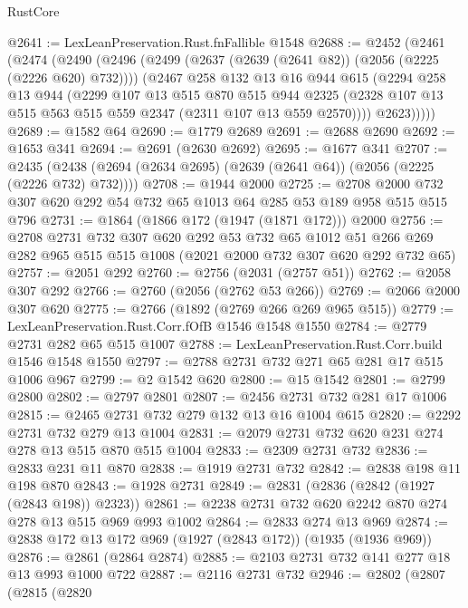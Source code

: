 \begin{lexlean}{RustCore}
\begin{coremodule}
@2641 := LexLeanPreservation.Rust.fnFallible @1548
@2688 := @2452
    (@2461
      (@2474
        (@2490
          (@2496
            (@2499 (@2637 (@2639 (@2641 @82)) (@2056 (@2225 (@2226 @620) @732))))
            (@2467
              @258
              @132
              @13
              @16
              @944
              @615
              (@2294
                @258
                @13
                @944
                (@2299
                  @107
                  @13
                  @515
                  @870
                  @515
                  @944
                  @2325
                  (@2328 @107 @13 @515 @563 @515 @559 @2347 (@2311 @107 @13 @559 @2570))))
              @2623)))))
@2689 := @1582 @64
@2690 := @1779 @2689
@2691 := @2688 @2690
@2692 := @1653 @341
@2694 := @2691 (@2630 @2692)
@2695 := @1677 @341
@2707 := @2435 (@2438 (@2694 (@2634 @2695) (@2639 (@2641 @64)) (@2056 (@2225 (@2226 @732) @732))))
@2708 := @1944 @2000
@2725 := @2708 @2000 @732 @307 @620 @292 @54 @732 @65 @1013 @64 @285 @53 @189 @958 @515 @515 @796
@2731 := @1864 (@1866 @172 (@1947 (@1871 @172))) @2000
@2756 := @2708
    @2731
    @732
    @307
    @620
    @292
    @53
    @732
    @65
    @1012
    @51
    @266
    @269
    @282
    @965
    @515
    @515
    @1008
    (@2021 @2000 @732 @307 @620 @292 @732 @65)
@2757 := @2051 @292
@2760 := @2756 (@2031 (@2757 @51))
@2762 := @2058 @307 @292
@2766 := @2760 (@2056 (@2762 @53 @266))
@2769 := @2066 @2000 @307 @620
@2775 := @2766 (@1892 (@2769 @266 @269 @965 @515))
@2779 := LexLeanPreservation.Rust.Corr.fOfB @1546 @1548 @1550
@2784 := @2779 @2731 @282 @65 @515 @1007
@2788 := LexLeanPreservation.Rust.Corr.build @1546 @1548 @1550
@2797 := @2788 @2731 @732 @271 @65 @281 @17 @515 @1006 @967
@2799 := @2 @1542 @620
@2800 := @15 @1542
@2801 := @2799 @2800
@2802 := @2797 @2801
@2807 := @2456 @2731 @732 @281 @17 @1006
@2815 := @2465 @2731 @732 @279 @132 @13 @16 @1004 @615
@2820 := @2292 @2731 @732 @279 @13 @1004
@2831 := @2079 @2731 @732 @620 @231 @274 @278 @13 @515 @870 @515 @1004
@2833 := @2309 @2731 @732
@2836 := @2833 @231 @11 @870
@2838 := @1919 @2731 @732
@2842 := @2838 @198 @11 @198 @870
@2843 := @1928 @2731
@2849 := @2831 (@2836 (@2842 (@1927 (@2843 @198)) @2323))
@2861 := @2238 @2731 @732 @620 @2242 @870 @274 @278 @13 @515 @969 @993 @1002
@2864 := @2833 @274 @13 @969
@2874 := @2838 @172 @13 @172 @969 (@1927 (@2843 @172)) (@1935 (@1936 @969))
@2876 := @2861 (@2864 @2874)
@2885 := @2103 @2731 @732 @141 @277 @18 @13 @993 @1000 @722
@2887 := @2116 @2731 @732
@2946 := @2802
    (@2807
      (@2815
        (@2820

\end{coremodule}
\end{lexlean}
